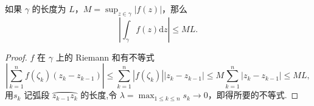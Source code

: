 \documentclass[../../main.tex]{subfiles}%
\begin{document}
\begin{theorem}\label{theorem:长大不等式}
如果 \( \gamma \) 的长度为 \( L \)，\( M = \sup_{z \in \gamma} |f(z)| \)，那么
\[
\left| \int_\gamma f(z)\mathrm{d}z \right| \leqslant ML. \tag{4}
\]
\end{theorem}
\begin{proof}
\( f \) 在 \( \gamma \) 上的 Riemann 和有不等式
\[
\left| \sum_{k = 1}^n f(\zeta_k)(z_k - z_{k - 1}) \right| \leqslant \sum_{k = 1}^n |f(\zeta_k)| |z_k - z_{k - 1}|
\leqslant M \sum_{k = 1}^n |z_k - z_{k - 1}|
\leqslant ML,
\]
用\( s_k \) 记弧段 \( \wideparen{z_{k - 1}z_k} \) 的长度,令 \( \lambda = \max_{1 \leqslant k \leqslant n} s_k \to 0 \)，即得所要的不等式.
\end{proof}
\end{document}
